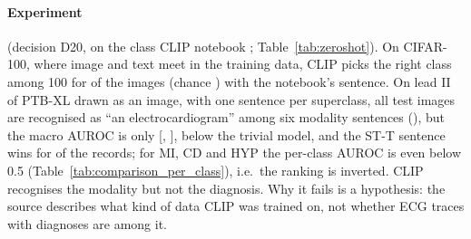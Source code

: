 \paragraph{Experiment} (decision D20, on the class CLIP notebook \cite{course_nb_clip};
Table~\ref{tab:zeroshot}). On CIFAR-100, where image and text meet in the training data, CLIP picks the
right class among 100 for \zeroshotCifarTopOneNotebook{} of the images (chance \zeroshotCifarChanceTopOne{})
with the notebook's sentence. On lead II of PTB-XL drawn as an image, with one sentence per superclass, all
test images are recognised as ``an electrocardiogram'' among six modality sentences
(\zeroshotFracModalityEcgTestPct{}), but the macro AUROC is only \zeroshotTestMacroAuroc{}
[\zeroshotTestMacroAurocLo{}, \zeroshotTestMacroAurocHi{}], below the trivial model, and the ST-T sentence
wins for \zeroshotFracTopSTTCTestPct{} of the records; for MI, CD and HYP the per-class AUROC is even below
0.5 (Table~\ref{tab:comparison_per_class}), i.e.\ the ranking is inverted. CLIP recognises the modality but not the diagnosis.
Why it fails is a hypothesis: the source describes what kind of data CLIP was trained on, not whether ECG
traces with diagnoses are among it.


